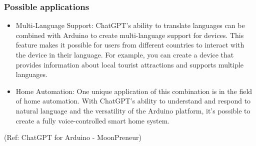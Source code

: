 




\begin{frame}[fragile]\frametitle{Possible applications}



\begin{itemize}
\item Multi-Language Support: ChatGPT’s ability to translate languages can be combined with Arduino to create multi-language support for devices. This feature makes it possible for users from different countries to interact with the device in their language. For example, you can create a device that provides information about local tourist attractions and supports multiple languages.
\item Home Automation: One unique application of this combination is in the field of home automation. With ChatGPT’s ability to understand and respond to natural language and the versatility of the Arduino platform, it’s possible to create a fully voice-controlled smart home system. 
\end{itemize}	 



\tiny{(Ref: ChatGPT for Arduino - MoonPreneur)}
\end{frame}

